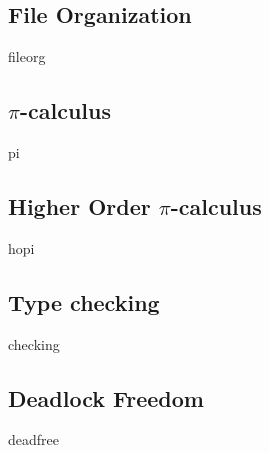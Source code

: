 \subsection{File Organization}
{fileorg}

\subsection{\texorpdfstring{$\pi$}{pi}-calculus}
{pi}

\subsection{Higher Order \texorpdfstring{$\pi$}{pi}-calculus}
{hopi}

\subsection{Type checking}
{checking}

\subsection{Deadlock Freedom}
{deadfree}